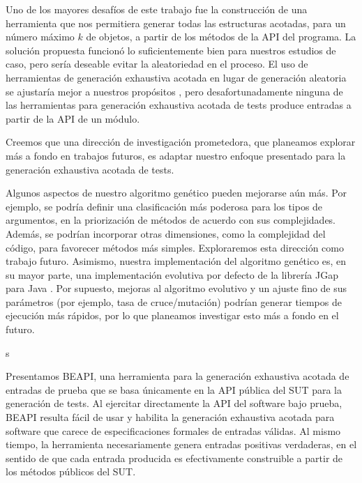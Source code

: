 Uno de los mayores desafíos de este trabajo fue la construcción de una herramienta que nos permitiera generar todas las estructuras acotadas, 
para un número máximo $k$ de objetos, a partir de los métodos de la API del programa. La solución propuesta funcionó lo suficientemente bien para nuestros estudios de caso, 
pero sería deseable evitar la aleatoriedad en el proceso. El uso de herramientas de generación exhaustiva acotada en lugar de generación aleatoria se ajustaría mejor a nuestros propósitos \cite{Boyapati02}, 
pero desafortunadamente ninguna de las herramientas para generación exhaustiva acotada de tests produce entradas a partir de la API de un módulo.

Creemos que una dirección de investigación prometedora, que planeamos explorar más a fondo en trabajos futuros, 
es adaptar nuestro enfoque presentado para la generación exhaustiva acotada de tests.

Algunos aspectos de nuestro algoritmo genético pueden mejorarse aún más. 
Por ejemplo, se podría definir una clasificación más poderosa para los tipos de argumentos, en la priorización de métodos de acuerdo con sus complejidades. Además, se podrían incorporar otras dimensiones, 
como la complejidad del código, para favorecer métodos más simples. Exploraremos esta dirección como trabajo futuro. 
Asimismo, nuestra implementación del algoritmo genético es, en su mayor parte, una implementación evolutiva por defecto de la librería JGap para Java \cite{jgrapht}. 
Por supuesto, mejoras al algoritmo evolutivo y un ajuste fino de sus parámetros (por ejemplo, tasa de cruce/mutación) podrían generar tiempos de ejecución más rápidos, 
por lo que planeamos investigar esto más a fondo en el futuro.

s

Presentamos BEAPI, una herramienta para la generación exhaustiva acotada de entradas de prueba que se basa únicamente en la API pública del SUT para la generación de tests. 
Al ejercitar directamente la API del software bajo prueba, BEAPI resulta fácil de usar y habilita la generación exhaustiva acotada para software que carece de especificaciones formales de entradas válidas. 
Al mismo tiempo, la herramienta necesariamente genera entradas positivas verdaderas, en el sentido de que cada entrada producida es efectivamente construible a partir de los métodos públicos del SUT.

